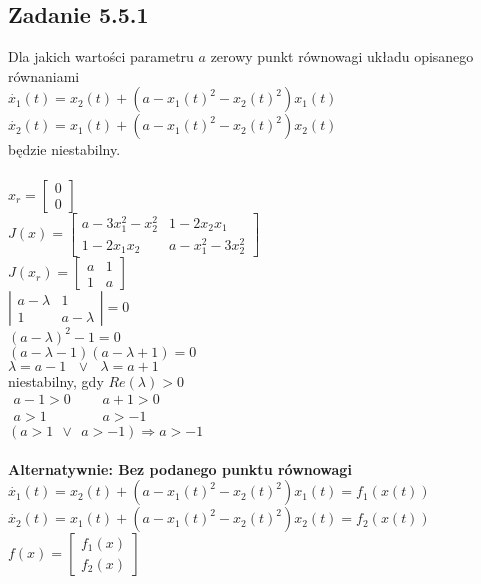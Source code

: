 \subsection*{Zadanie 5.5.1} {\color{darkgray}
	Dla jakich wartości parametru $a$ zerowy punkt równowagi układu opisanego równaniami\\
	$\dot{x_1}(t)=x_2(t)+(a-x_1(t)^2-x_2(t)^2)x_1(t)$\\
	$\dot{x_2}(t)=x_1(t)+(a-x_1(t)^2-x_2(t)^2)x_2(t)$\\
	będzie niestabilny.
}\\\\
$x_r=\left[ \begin{array}{c}     0\\0   \end{array}\right]$\\
$J(x)=\left[ \begin{array}{cc}    a-3x_1^2 -x_2^2&  1-2x_2x_1 \\ 1-2x_1x_2 & a-x_1^2-3x_2^2  \end{array}\right]$\\
$J(x_r)=\left[ \begin{array}{cc}    a&1\\1&a  \end{array}\right]$\\
$\left| \begin{array}{cc}    a-\lambda&1\\1&a-\lambda  \end{array}\right| =0$\\
$(a-\lambda)^2-1=0$\\
$(a-\lambda-1)(a-\lambda+1)=0$\\
$\lambda=a-1 \ \ \ \vee \ \ \ \lambda=a+1$\\
niestabilny, gdy $Re(\lambda)>0$\\
$\begin{array}{lll}     a-1>0& \ \ \  &a+1>0  \\ a>1 && a>-1 \end{array}$\\
$(a>1 \ \ \vee \ \ a>-1 ) \Rightarrow \boxed{a>-1}$\\
\\
{\color{red} \textbf{ Alternatywnie: Bez podanego punktu równowagi}}\\
$\dot{x_1}(t)=x_2(t)+(a-x_1(t)^2-x_2(t)^2)x_1(t)=f_1(x(t))$\\
$\dot{x_2}(t)=x_1(t)+(a-x_1(t)^2-x_2(t)^2)x_2(t)=f_2(x(t))$\\
$f(x)= \left[ \begin{array}{cc}    f_1(x)\\f_2(x)    \end{array}\right]$\\
